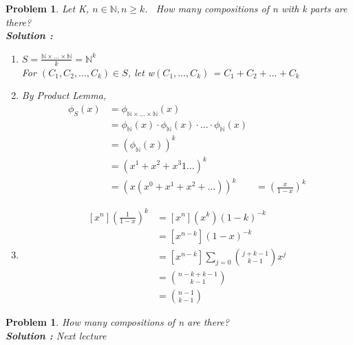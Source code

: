 \documentclass{article}
\newtheorem{expx}[theorem]{Problem}
\begin{document}
\newpage
\begin{expx}
Let K, \(n \in \mathbb{N}, n \geq k\). \
How many compositions of n with k parts are there?\\
\newline
\textbf{Solution : }
\begin{enumerate}
\item \(S= \frac{\mathbb{N} \times \ldots \times \mathbb{N}}{k} = \mathbb{N}^k\) \\
For \((C_1, C_2, \ldots, C_k) \in S\), let w\((C_1, \ldots, C_k)\) = \(C_1 + C_2 + \ldots + C_k\) 
\item By Product Lemma, 
\[\begin{aligned}\phi_S(x) & = \phi_{\mathbb{N} \times \ldots \times \mathbb{N} }(x)\\
 & = \phi_{\mathbb{N}} (x) \cdot \phi_{\mathbb{N}} (x) \cdot \ldots \cdot \phi_{\mathbb{N}} (x) \\
 & = \left(\phi_{\mathbb{N}} (x)\right)^k \\
 & = (x^1 + x^2 + x^3 1 \ldots)^k \\
 & = (x(x^0 + x^1 + x^2 + \ldots))^k
 & = \left(\frac{x}{1-x}\right)^k \end{aligned}\]
 \item \[\begin{aligned}
 [x^n]\left(\frac{1}{1-x}\right)^k & = [x^n](x^k)(1-k)^{-k} \\
 & = [x^{n-k}](1-x)^{-k} \\
 & = [x^{n-k}] \sum_{j = 0} {{j + k - 1} \choose {k-1}} x^j \\
 & = {{n-k+k-1} \choose {k-1}} \\
 & = {{n - 1} \choose {k-1}}
 \end{aligned}\]
 \end{enumerate}
\end{expx}

\begin{expx} How many compositions of n are there? \\
\textbf{Solution : } Next lecture 
\end{expx}
\end{document}
